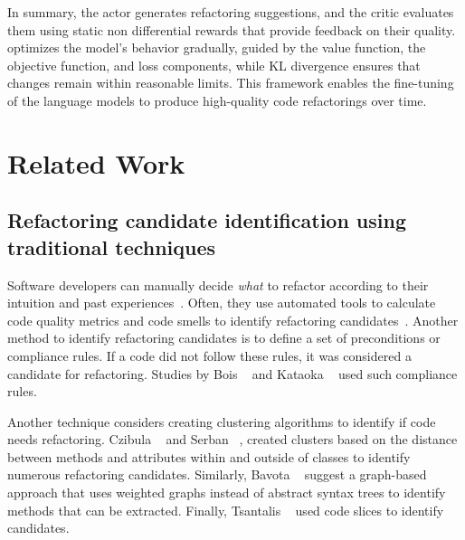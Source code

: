 In summary, the actor generates refactoring suggestions, and the critic evaluates them using static non differential rewards that provide feedback on their quality. \ppo{} optimizes the model's behavior gradually, guided by the value function, the objective function, and loss components, 
while KL divergence ensures that changes remain within reasonable limits. This framework enables the fine-tuning of the language models to produce high-quality code refactorings over time.


\section{Related Work}

\subsection{Refactoring candidate identification using traditional techniques}

Software developers can manually decide \textit{what} to refactor according to their intuition and past experiences~\cite{Al2015Identifying}.
Often, they use automated tools to calculate code quality metrics and code smells to identify refactoring candidates~\cite{Mens2004Survey, Al2015Identifying}. 
Another method to identify refactoring candidates is to define a set of preconditions or compliance rules. If a code did not follow these rules, it was considered a candidate for refactoring. Studies by Bois \etal{}~\cite{Du2004Refactoring} and Kataoka \etal{}~\cite{Kataoka2001Automated} used such compliance rules.

Another technique considers creating clustering algorithms to identify if code needs refactoring. 
Czibula \etal{}~\cite{Czibula2008Hierarchical} and Serban \etal{}~\cite{Serban2007Restructuring}, 
created clusters based on the distance between methods and attributes within and outside of classes to identify numerous refactoring candidates.
Similarly, Bavota \etal{}~\cite{Bavota2011Identifying} suggest a graph-based approach that uses weighted graphs instead of abstract syntax trees to identify methods that can be extracted. 
Finally, Tsantalis \etal{}~\cite{Tsantalis2009Identification} used code slices to identify \exm{} candidates.

